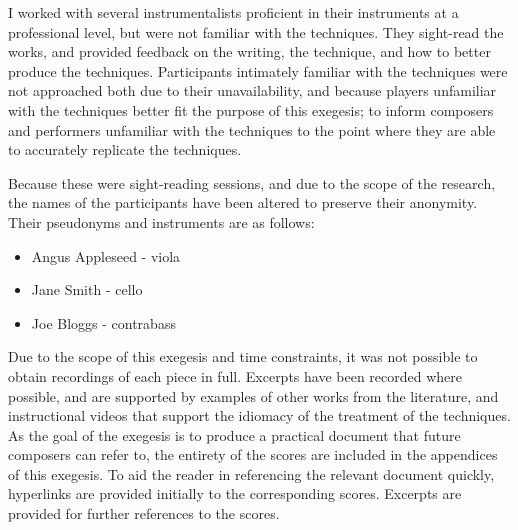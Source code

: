 I worked with several instrumentalists proficient in their instruments at a professional level, but were not familiar with the techniques.
They sight-read the works, and provided feedback on the writing, the technique, and how to better produce the techniques.
Participants intimately familiar with the techniques were not approached both due to their unavailability, and because players unfamiliar with the techniques better fit the purpose of this exegesis; 
to inform composers and performers unfamiliar with the techniques to the point where they are able to accurately replicate the techniques.

Because these were sight-reading sessions, and due to the scope of the research, the names of the participants have been altered to preserve their anonymity.
Their pseudonyms and instruments are as follows:

\begin{itemize}
  \item Angus Appleseed - viola
  \item Jane Smith - cello
  \item Joe Bloggs - contrabass
\end{itemize}

Due to the scope of this exegesis and time constraints, it was not possible to obtain recordings of each piece in full.
Excerpts have been recorded where possible, and are supported by examples of other works from the literature, and instructional videos that support the idiomacy of the treatment of the techniques.
As the goal of the exegesis is to produce a practical document that future composers can refer to, the entirety of the scores are included in the appendices of this exegesis.
To aid the reader in referencing the relevant document quickly, hyperlinks are provided initially to the corresponding scores. 
Excerpts are provided for further references to the scores.


